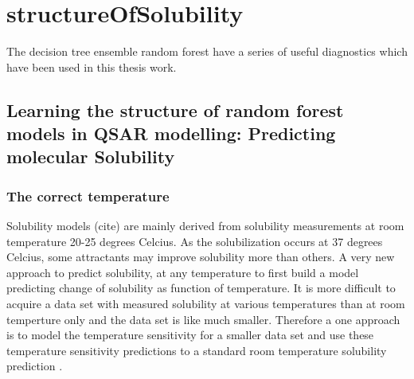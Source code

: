 \chapter{structureOfSolubility}

The decision tree ensemble random forest have a series of useful diagnostics which have been used in this thesis work.

\section{Learning the structure of random forest models in QSAR
modelling: Predicting molecular Solubility}




\subsection{The correct temperature}
Solubility models (cite) are mainly derived from solubility measurements at room temperature 20-25 degrees Celcius. As the solubilization occurs at 37 degrees Celcius, some attractants may improve solubility more than others. A very new approach to predict solubility, at any temperature to first build a model predicting change of solubility as function of temperature. It is more difficult to acquire a data set with measured solubility at various temperatures than at room temperture only and the data set is like much smaller. Therefore a one approach is to model the temperature sensitivity for a smaller data set and use these temperature sensitivity predictions to a standard room temperature solubility prediction \cite{klimenko2016novel}.